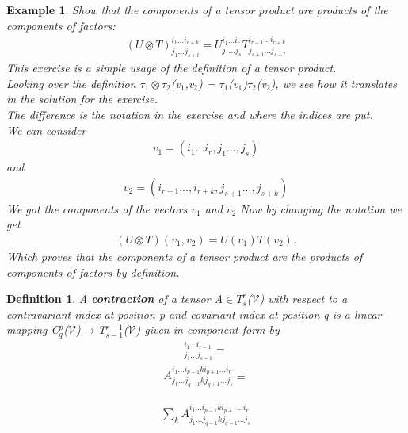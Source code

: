 \documentclass[12pt,a4paper]{article}
\newtheorem{defn}[thm]{Definition}
\newtheorem{exmp}{Example}[section]
\begin{document}
\begin{exmp}
Show that the components of a tensor product are products of the components of factors:
\begin{align*}
(U \otimes T)^{i_1 ... i_{r+k}}_{j_1 ... j_{s+l}} = U ^{i_1 ... i_{r}}_{j_1 ... j_{s}} T ^{i_{r+1} ... i_{r+k}}_{j_{s+1}... j_{s+l}}
\end{align*}
This exercise is a simple usage of the definition of a tensor product.\\
Looking over the definition $\tau_1\otimes \tau_2$(v$_1$,v$_2$) = $\tau_1$(v$_1$)$\tau_2$(v$_2$), we see how it translates in the solution for the exercise.\\
The difference is the notation in the exercise and where the indices are put. \\
We can consider
\begin{align*}
v_1 = (i_1... i_r, j_1 ..., j_s)
\end{align*}
and
\begin{align*}
v_2 = (i_{r+1} ..., i_{r+k}, j_{s+1} ... ,j_{s+k})
\end{align*}
We got the components of the vectors $v_1$ and $v_2$
Now by changing the notation we get\\
\begin{align*}
(U \otimes T)(v_1, v_2) = U (v_1) T (v_2).
\end{align*}
Which proves that the components of a tensor product are the products of components of factors by definition.
\end{exmp}
\begin{defn}
A \textbf{contraction} of a tensor A$\in T^r_s$($\mathcal{V}$) with respect to a contravariant index at position p and covariant index at position q is a linear mapping C$^p_q$($\mathcal{V}$)$\to$T$^{r-1}_{s-1}$($\mathcal{V}$) given in \textit{component form} by
\begin{align*}
	[C^p_q(A)]^{i_1...i_{r-1}}_{j_1...j_{s-1}} = 
\end{align*}
\begin{align*}
A ^{i_1...i_{p-1}ki_{p+1}...i_r}_{j_1...j_{q-1}kj_{q+1}...j_s}  \equiv
\end{align*}

\begin{align*}
 \sum_{k}A ^{i_1...i_{p-1}ki_{p+1}...i_r}_{j_1...j_{q-1}kj_{q+1}...j_s}
\end{align*}
\end{defn}
\end{document}

